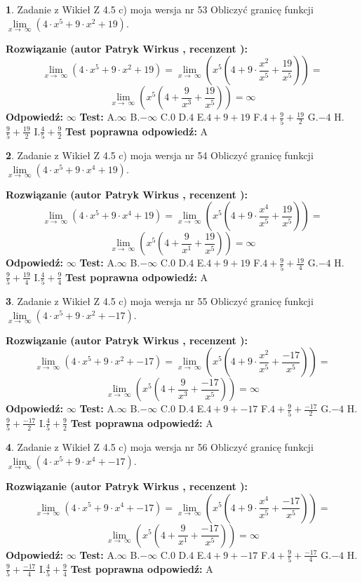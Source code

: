 \documentclass[12pt, a4paper]{article}
\theoremstyle{definition} %
\newtheorem{zad}{}
\newcommand{\zadStart}[1]{\begin{zad}#1\newline}
\newcommand{\zadStop}{\end{zad}}
\newcommand{\rozwStart}[2]{\noindent \textbf{Rozwiązanie (autor #1 , recenzent #2): }\newline}
\newcommand{\rozwStop}{\newline}
\newcommand{\odpStart}{\noindent \textbf{Odpowiedź:}\newline}
\newcommand{\odpStop}{\newline}
\newcommand{\testStart}{\noindent \textbf{Test:}\newline}
\newcommand{\testStop}{\newline}
\newcommand{\kluczStart}{\noindent \textbf{Test poprawna odpowiedź:}\newline}
\newcommand{\kluczStop}{\newline}
\begin{document}
\zadStart{Zadanie z Wikieł Z 4.5 c) moja wersja nr 53}
Obliczyć granicę funkcji  $\lim\limits_{x\to\ \infty}(4 \cdot x^{5}+9 \cdot x^{2}+19)$.
\zadStop
\rozwStart{Patryk Wirkus}{}
$$\lim\limits_{x\to\ \infty}(4 \cdot x^{5}+9 \cdot x^{2}+19) = \lim\limits_{x\to\ \infty}(x^{5}(4 +9 \cdot \frac{x^{2}}{x^{5}}+\frac{19}{x^{5}})) =$$ $$\lim\limits_{x\to\ \infty}(x^{5}(4 +\frac{9}{x^{3}}+\frac{19}{x^{5}})) =\infty$$
\rozwStop
\odpStart
$\infty$
\odpStop
\testStart
A.$\infty$ B.$-\infty$ C.$0$ D.$4$ E.$4 + 9 + 19$
F.$4+\frac{9}{5}+\frac{19}{2}$ G.$-4$
H.$\frac{9}{5}+\frac{19}{2}$
I.$\frac{4}{5}+\frac{9}{2}$
\testStop
\kluczStart
A
\kluczStop



\zadStart{Zadanie z Wikieł Z 4.5 c) moja wersja nr 54}
Obliczyć granicę funkcji  $\lim\limits_{x\to\ \infty}(4 \cdot x^{5}+9 \cdot x^{4}+19)$.
\zadStop
\rozwStart{Patryk Wirkus}{}
$$\lim\limits_{x\to\ \infty}(4 \cdot x^{5}+9 \cdot x^{4}+19) = \lim\limits_{x\to\ \infty}(x^{5}(4 +9 \cdot \frac{x^{4}}{x^{5}}+\frac{19}{x^{5}})) =$$ $$\lim\limits_{x\to\ \infty}(x^{5}(4 +\frac{9}{x^{1}}+\frac{19}{x^{5}})) =\infty$$
\rozwStop
\odpStart
$\infty$
\odpStop
\testStart
A.$\infty$ B.$-\infty$ C.$0$ D.$4$ E.$4 + 9 + 19$
F.$4+\frac{9}{5}+\frac{19}{4}$ G.$-4$
H.$\frac{9}{5}+\frac{19}{4}$
I.$\frac{4}{5}+\frac{9}{4}$
\testStop
\kluczStart
A
\kluczStop



\zadStart{Zadanie z Wikieł Z 4.5 c) moja wersja nr 55}
Obliczyć granicę funkcji  $\lim\limits_{x\to\ \infty}(4 \cdot x^{5}+9 \cdot x^{2}+-17)$.
\zadStop
\rozwStart{Patryk Wirkus}{}
$$\lim\limits_{x\to\ \infty}(4 \cdot x^{5}+9 \cdot x^{2}+-17) = \lim\limits_{x\to\ \infty}(x^{5}(4 +9 \cdot \frac{x^{2}}{x^{5}}+\frac{-17}{x^{5}})) =$$ $$\lim\limits_{x\to\ \infty}(x^{5}(4 +\frac{9}{x^{3}}+\frac{-17}{x^{5}})) =\infty$$
\rozwStop
\odpStart
$\infty$
\odpStop
\testStart
A.$\infty$ B.$-\infty$ C.$0$ D.$4$ E.$4 + 9 + -17$
F.$4+\frac{9}{5}+\frac{-17}{2}$ G.$-4$
H.$\frac{9}{5}+\frac{-17}{2}$
I.$\frac{4}{5}+\frac{9}{2}$
\testStop
\kluczStart
A
\kluczStop



\zadStart{Zadanie z Wikieł Z 4.5 c) moja wersja nr 56}
Obliczyć granicę funkcji  $\lim\limits_{x\to\ \infty}(4 \cdot x^{5}+9 \cdot x^{4}+-17)$.
\zadStop
\rozwStart{Patryk Wirkus}{}
$$\lim\limits_{x\to\ \infty}(4 \cdot x^{5}+9 \cdot x^{4}+-17) = \lim\limits_{x\to\ \infty}(x^{5}(4 +9 \cdot \frac{x^{4}}{x^{5}}+\frac{-17}{x^{5}})) =$$ $$\lim\limits_{x\to\ \infty}(x^{5}(4 +\frac{9}{x^{1}}+\frac{-17}{x^{5}})) =\infty$$
\rozwStop
\odpStart
$\infty$
\odpStop
\testStart
A.$\infty$ B.$-\infty$ C.$0$ D.$4$ E.$4 + 9 + -17$
F.$4+\frac{9}{5}+\frac{-17}{4}$ G.$-4$
H.$\frac{9}{5}+\frac{-17}{4}$
I.$\frac{4}{5}+\frac{9}{4}$
\testStop
\kluczStart
A
\kluczStop
\end{document}
